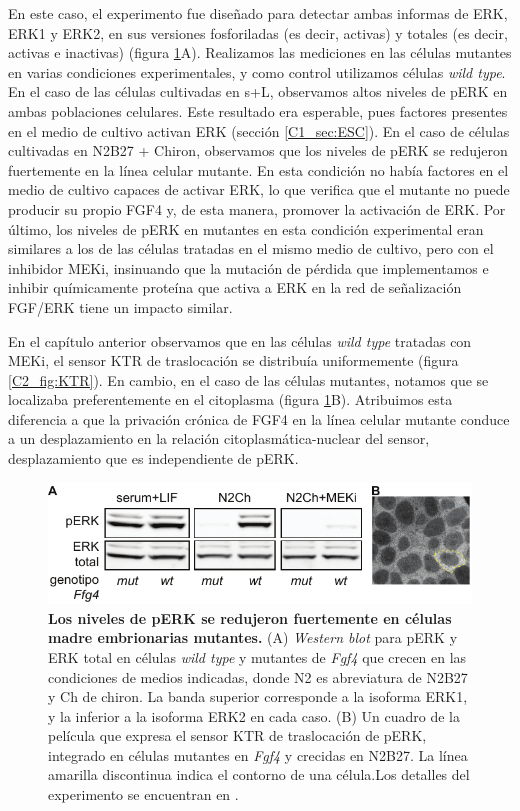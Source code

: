 \documentclass[./main.tex]{subfiles}
\begin{document}
En este caso, el experimento fue diseñado para detectar ambas informas de ERK, ERK1 y ERK2, en sus versiones fosforiladas (es decir, activas) y totales (es decir, activas e inactivas) (figura \ref{C3_fig:FGF_mutante}A). Realizamos las mediciones en las células mutantes en varias condiciones experimentales, y como control utilizamos células \textit{wild type}. En el caso de las células cultivadas en s+L, observamos altos niveles de pERK en ambas poblaciones celulares. Este resultado era esperable, pues factores presentes en el medio de cultivo activan ERK (sección \ref{C1_sec:ESC}). En el caso de células cultivadas en N2B27 + Chiron, observamos que los niveles de pERK se redujeron fuertemente en la línea celular mutante. En esta condición no había factores en el medio de cultivo capaces de activar ERK, lo que verifica que el mutante no puede producir su propio FGF4 y, de esta manera, promover la activación de ERK. Por último, los niveles de pERK en mutantes en esta condición experimental eran similares a los de las células tratadas en el mismo medio de cultivo, pero con el inhibidor MEKi, insinuando que la mutación de pérdida que implementamos e inhibir químicamente proteína que activa a ERK en la red de señalización FGF/ERK tiene un impacto similar. 


En el capítulo anterior observamos que en las células \textit{wild type} tratadas con MEKi, el sensor KTR de traslocación se distribuía uniformemente (figura \ref{C2_fig:KTR}). En cambio, en el caso de las células mutantes, notamos que se localizaba preferentemente en el citoplasma (figura \ref{C3_fig:FGF_mutante}B). Atribuimos esta diferencia a que la privación crónica de FGF4 en la línea celular mutante conduce a un desplazamiento en la relación citoplasmática-nuclear del sensor, desplazamiento que es independiente de pERK. 



\begin{figure}
    \centering
    \includegraphics[width=1\columnwidth]{figures/chapter3/C3_FGF_mutant.pdf} 
    \caption{\textbf{Los niveles de pERK se redujeron fuertemente en células madre embrionarias mutantes.} (A) \textit{Western blot} para pERK y ERK total en células \textit{wild type} y mutantes de \textit{Fgf4} que crecen en las condiciones de medios indicadas, donde N2 es abreviatura de N2B27 y Ch de chiron. La banda superior corresponde a la isoforma ERK1, y la inferior a la isoforma ERK2 en cada caso. (B) Un cuadro de la película que expresa el sensor KTR de traslocación de pERK, integrado en células mutantes en \textit{Fgf4} y crecidas en N2B27. La línea amarilla discontinua indica el contorno de una célula.Los detalles del experimento se encuentran en \cite{Fabris2022}.}
    \label{C3_fig:FGF_mutante}
\end{figure}
\end{document}

